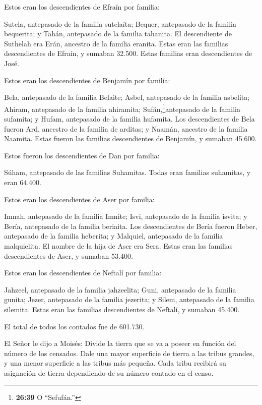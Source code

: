  Estos eran los descendientes de Efraín por familia:

Sutela, antepasado de la familia sutelaíta; Bequer, antepasado de la
familia bequerita; y Tahán, antepasado de la familia tahanita.
 El descendiente de Suthelah era Erán, ancestro de la
familia eranita.  Estas eran las familias descendientes de
Efraín, y sumaban 32.500. Estas familias eran descendientes de José.

 Estos eran los descendientes de Benjamín por familia:

Bela, antepasado de la familia Belaite; Asbel, antepasado de la familia
asbelita; Ahiram, antepasado de la familia ahiramita; 
Sufán,\footnote{\textbf{26:39} O ``Sefufán.''}antepasado de la familia
sufamita; y Hufam, antepasado de la familia hufamita.  Los
descendientes de Bela fueron Ard, ancestro de la familia de arditas; y
Naamán, ancestro de la familia Naamita.  Estas fueron las
familias descendientes de Benjamín, y sumaban 45.600.

 Estos fueron los descendientes de Dan por familia:

Súham, antepasado de las familias Suhamitas.  Todas eran
familias suhamitas, y eran 64.400.

 Estos eran los descendientes de Aser por familia:

Imnah, antepasado de la familia Imnite; Isvi, antepasado de la familia
isvita; y Bería, antepasado de la familia beriaita.  Los
descendientes de Bería fueron Heber, antepasado de la familia heberita;
y Malquiel, antepasado de la familia malquielita.  El
nombre de la hija de Aser era Sera.  Estas eran las
familias descendientes de Aser, y sumaban 53.400.

 Estos eran los descendientes de Neftalí por familia:

Jahzeel, antepasado de la familia jahzeelita; Guni, antepasado de la
familia gunita;  Jezer, antepasado de la familia jezerita;
y Silem, antepasado de la familia silemita.  Estas eran las
familias descendientes de Neftalí, y sumaban 45.400.

 El total de todos los contados fue de 601.730.

 El Señor le dijo a Moisés:  Divide la tierra
que se va a poseer en función del número de los censados. 
Dale una mayor superficie de tierra a las tribus grandes, y una menor
superficie a las tribus más pequeña. Cada tribu recibirá su asignación
de tierra dependiendo de su número contado en el censo.


